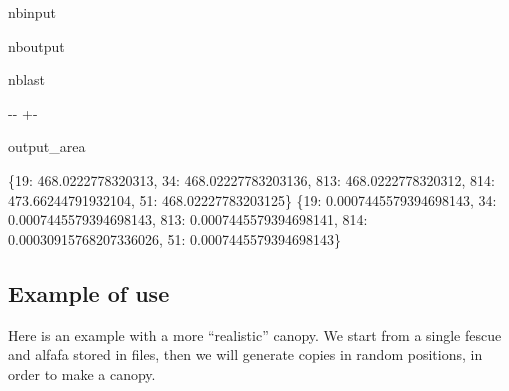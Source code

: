 \documentclass[letterpaper,10pt,english]{sphinxmanual}
\begin{document}
\begin{sphinxuseclass}{nbinput}
{
\begin{sphinxVerbatim}[commandchars=\\\{\}]
\llap{\color{nbsphinxin}[27]:\,\hspace{\fboxrule}\hspace{\fboxsep}}
\end{sphinxVerbatim}
}

\end{sphinxuseclass}
\begin{sphinxuseclass}{nboutput}
\begin{sphinxuseclass}{nblast}
{

\kern-\sphinxverbatimsmallskipamount\kern-\baselineskip
\kern+\FrameHeightAdjust\kern-\fboxrule
\vspace{\nbsphinxcodecellspacing}

\begin{sphinxuseclass}{output_area}
\begin{sphinxuseclass}{}


\begin{sphinxVerbatim}[commandchars=\\\{\}]
\{19: 468.0222778320313, 34: 468.02227783203136, 813: 468.0222778320312, 814: 473.66244791932104, 51: 468.02227783203125\}
\{19: 0.0007445579394698143, 34: 0.0007445579394698143, 813: 0.0007445579394698141, 814: 0.00030915768207336026, 51: 0.0007445579394698143\}
\end{sphinxVerbatim}



\end{sphinxuseclass}
\end{sphinxuseclass}
}

\end{sphinxuseclass}
\end{sphinxuseclass}
\sphinxstepscope


\subsection{Example of use}
\label{\detokenize{example_canopy:Example-of-use}}\label{\detokenize{example_canopy::doc}}
\sphinxAtStartPar
Here is an example with a more “realistic” canopy. We start from a single fescue and alfafa stored in  files, then we will generate copies in random positions, in order to make a canopy.
\end{document}
